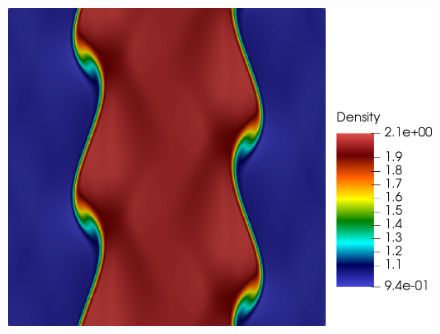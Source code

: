 \begin{figure}[h!]
\includegraphics[scale=0.115]{data/Compressible_Euler/KH/Snapshots/density_exact_461.png}\\


\end{figure}
